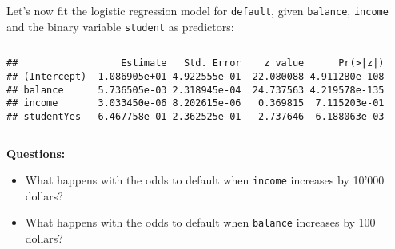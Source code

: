 \documentclass[10pt,ignorenonframetext,]{beamer}
\newenvironment{Shaded}{\begin{snugshade}}{\end{snugshade}}
\newcommand{\DataTypeTok}[1]{\textcolor[rgb]{0.13,0.29,0.53}{#1}}
\newcommand{\KeywordTok}[1]{\textcolor[rgb]{0.13,0.29,0.53}{\textbf{#1}}}
\newcommand{\NormalTok}[1]{#1}
\newcommand{\OperatorTok}[1]{\textcolor[rgb]{0.81,0.36,0.00}{\textbf{#1}}}
\newcommand{\StringTok}[1]{\textcolor[rgb]{0.31,0.60,0.02}{#1}}
\providecommand{\tightlist}{%
  \setlength{\itemsep}{0pt}\setlength{\parskip}{0pt}}
\begin{document}
\begin{frame}[fragile]

Let's now fit the logistic regression model for \texttt{default}, given
\texttt{balance}, \texttt{income} and the binary variable
\texttt{student} as predictors:

\(~\)

\scriptsize

\begin{Shaded}
\end{Shaded}

\begin{verbatim}
##                  Estimate   Std. Error    z value      Pr(>|z|)
## (Intercept) -1.086905e+01 4.922555e-01 -22.080088 4.911280e-108
## balance      5.736505e-03 2.318945e-04  24.737563 4.219578e-135
## income       3.033450e-06 8.202615e-06   0.369815  7.115203e-01
## studentYes  -6.467758e-01 2.362525e-01  -2.737646  6.188063e-03
\end{verbatim}

\(~\)

\normalsize

\textbf{Questions:}

\begin{itemize}
\tightlist
\item
  What happens with the odds to default when \texttt{income} increases
  by 10'000 dollars?
\end{itemize}

\begin{itemize}
\tightlist
\item
  What happens with the odds to default when \texttt{balance} increases
  by 100 dollars?
\end{itemize}

\end{frame}
\end{document}
